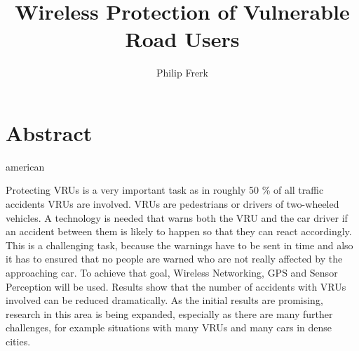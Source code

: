 \documentclass[]{ccs-thesis}
\author{Philip Frerk}
\title{Wireless Protection of Vulnerable Road Users}
\begin{document}

\maketitle



\chapter*{Abstract}
\begin{otherlanguage*}{american}

Protecting \acp{VRU} is a very important task as in roughly 50 \% of all traffic accidents \acp{VRU} are involved. \acp{VRU} are pedestrians or drivers of two-wheeled vehicles.
A technology is needed that warns both the \ac{VRU} and the car driver if an accident between them is likely to happen so that they can react accordingly.  This is a challenging task, because the warnings have to be sent in time  and also it has to ensured that no people are warned who are not really affected by the approaching car.
To achieve that goal, Wireless Networking, GPS and Sensor Perception will be used.
Results show that the number of accidents with \acp{VRU} involved can be reduced dramatically.
As the initial results are promising, research in this area is being expanded, especially as there are many further challenges, for example situations with many \acp{VRU} and many cars in dense cities.


\end{otherlanguage*}
\end{document}
